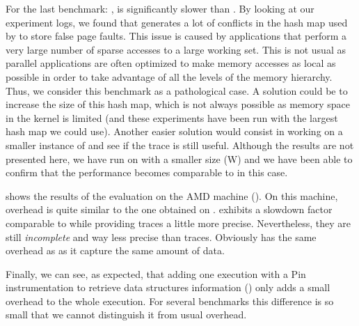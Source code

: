 For the last benchmark: \MG, \Moca is significantly slower than \TABARNAC.
By looking at our
experiment logs, we found that \MG generates a lot of conflicts in the hash map used by
\Moca to store false page faults. This issue is caused by applications that perform a very large number of sparse accesses to a large working set.
This is not usual as parallel applications are often optimized to make memory accesses as local as possible in order to take advantage of all the levels of the
memory hierarchy.
Thus, we consider this benchmark as a pathological case.
A solution could be to increase the size of
this hash map, which is not always possible as memory space in the kernel is
limited (and these experiments have been run with the largest hash map we could use). Another easier solution would consist in working on a smaller instance
of \MG and see if the trace is still useful. Although the results are not presented here, we have run \Moca on \MG with a smaller size (W) and we have been able
to confirm that the performance becomes comparable to \TABARNAC in this case.

 shows the results of the evaluation on the AMD machine
(\Stremi). On this machine, \Moca overhead is quite similar to the one
obtained on \Edel.
\MemProf exhibits a slowdown factor comparable to \Mitos while
providing traces a little more precise. Nevertheless, they are still \emph{incomplete} and
way less precise than \Moca traces. Obviously \MemProfTun has the same
overhead as \MemProf as it capture the same amount of data.

Finally, we can see, as expected, that adding one execution with a Pin
instrumentation to retrieve data structures information (\MocaPin) only adds a small overhead
to the whole \Moca execution. For several benchmarks this difference is so small that we cannot
distinguish it from \Moca usual overhead.

